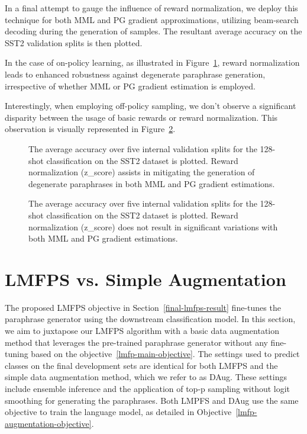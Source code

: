 \documentclass[11pt]{article}
\begin{document}
In a final attempt to gauge the influence of reward normalization, we deploy this technique for both MML and PG gradient approximations, utilizing beam-search decoding during the generation of samples. The resultant average accuracy on the SST2 validation splits is then plotted.

In the case of on-policy learning, as illustrated in Figure~\ref{zscore-on-policy}, reward normalization leads to enhanced robustness against degenerate paraphrase generation, irrespective of whether MML or PG gradient estimation is employed.

Interestingly, when employing off-policy sampling, we don't observe a significant disparity between the usage of basic rewards or reward normalization. This observation is visually represented in Figure~\ref{zscore-off-policy}.

\begin{figure}[h]
\begin{center}

\end{center}
\caption{The average accuracy over five internal validation splits for the 128-shot classification on the SST2 dataset is plotted. Reward normalization (z\_score) assists in mitigating the generation of degenerate paraphrases in both MML and PG gradient estimations.}
\label{zscore-on-policy}
\end{figure}

\begin{figure}[h]
\begin{center}

\end{center}
\caption{The average accuracy over five internal validation splits for the 128-shot classification on the SST2 dataset is plotted. Reward normalization (z\_score) does not result in significant variations with both MML and PG gradient estimations.}
\label{zscore-off-policy}
\end{figure}

\section{LMFPS vs. Simple Augmentation}
\label{lmfps-simple-augmentation:appendix}
The proposed LMFPS objective in Section~\ref{final-lmfps-result} fine-tunes the paraphrase generator using the downstream classification model. In this section, we aim to juxtapose our LMFPS algorithm with a basic data augmentation method that leverages the pre-trained paraphrase generator without any fine-tuning based on the objective~\ref{lmfp-main-objective}. The settings used to predict classes on the final development sets are identical for both LMFPS and the simple data augmentation method, which we refer to as DAug. These settings include ensemble inference and the application of top-p sampling without logit smoothing for generating the paraphrases. Both LMPFS and DAug use the same objective to train the language model, as detailed in Objective~\ref{lmfp-augmentation-objective}.
\end{document}
